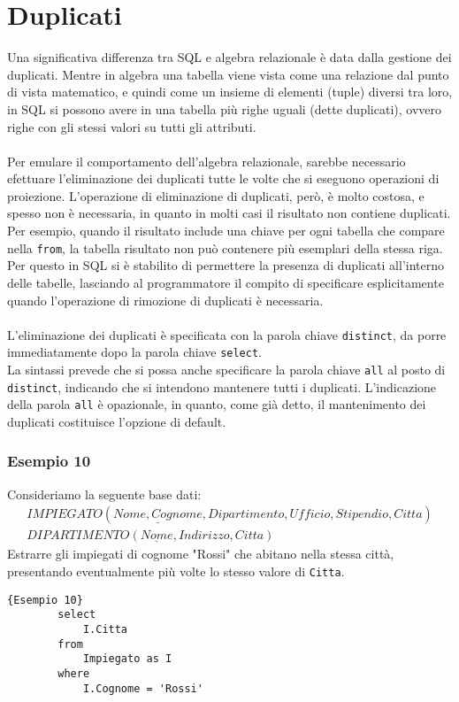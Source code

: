 \section{Duplicati}
Una significativa differenza tra SQL e algebra relazionale è data dalla gestione dei duplicati. Mentre in algebra una tabella viene vista come una relazione dal punto di vista matematico, e quindi come un insieme di elementi (tuple) diversi tra loro, in SQL si possono avere in una tabella più righe uguali (dette duplicati), ovvero righe con gli stessi valori su tutti gli attributi.\\\\
Per emulare il comportamento dell'algebra relazionale, sarebbe necessario efettuare l'eliminazione dei duplicati tutte le volte che si eseguono operazioni di proiezione. L'operazione di eliminazione di duplicati, però, è molto costosa, e spesso non è necessaria, in quanto in molti casi il risultato non contiene duplicati.\\
Per esempio, quando il risultato include una chiave per ogni tabella che compare nella \texttt{from}, la tabella risultato non può contenere più esemplari della stessa riga. Per questo in SQL si è stabilito di permettere la presenza di duplicati all'interno delle tabelle, lasciando al programmatore il compito di specificare esplicitamente quando l'operazione di rimozione di duplicati è necessaria.\\\\
L'eliminazione dei duplicati è specificata con la parola chiave \texttt{distinct}, da porre immediatamente dopo la parola chiave \texttt{select}.\\
La sintassi prevede che si possa anche specificare la parola chiave \texttt{all} al posto di \texttt{distinct}, indicando che si intendono mantenere tutti i duplicati. L'indicazione della parola \texttt{all} è opazionale, in quanto, come già detto, il mantenimento dei duplicati costituisce l'opzione di default.

\subsubsection{Esempio 10}
Consideriamo la seguente base dati:
    \begin{equation}\begin{aligned}
        IMPIEGATO (\underline{Nome, Cognome}, Dipartimento, Ufficio, Stipendio, Citta)\\
        DIPARTIMENTO (\underline{Nome}, Indirizzo, Citta)
    \end{aligned}\end{equation}
Estrarre gli impiegati di cognome "Rossi" che abitano nella stessa città, presentando eventualmente più volte lo stesso valore di \texttt{Citta}.
    \begin{lstlisting}{Esempio 10}
        select 
            I.Citta
        from 
            Impiegato as I
        where 
            I.Cognome = 'Rossi'
    \end{lstlisting}
    
